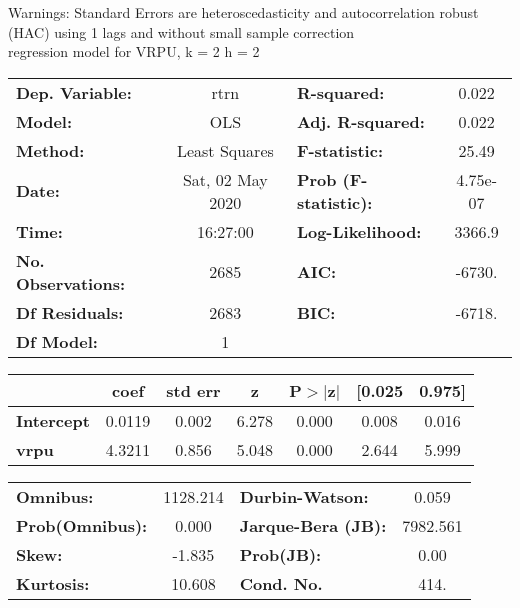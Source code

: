 Warnings: \newline
 [1] Standard Errors are heteroscedasticity and autocorrelation robust (HAC) using 1 lags and without small sample correction\\ 

regression model for VRPU, k = 2 h = 2\begin{center}
\begin{tabular}{lclc}
\toprule
\textbf{Dep. Variable:}    &       rtrn       & \textbf{  R-squared:         } &     0.022   \\
\textbf{Model:}            &       OLS        & \textbf{  Adj. R-squared:    } &     0.022   \\
\textbf{Method:}           &  Least Squares   & \textbf{  F-statistic:       } &     25.49   \\
\textbf{Date:}             & Sat, 02 May 2020 & \textbf{  Prob (F-statistic):} &  4.75e-07   \\
\textbf{Time:}             &     16:27:00     & \textbf{  Log-Likelihood:    } &    3366.9   \\
\textbf{No. Observations:} &        2685      & \textbf{  AIC:               } &    -6730.   \\
\textbf{Df Residuals:}     &        2683      & \textbf{  BIC:               } &    -6718.   \\
\textbf{Df Model:}         &           1      & \textbf{                     } &             \\
\bottomrule
\end{tabular}
\begin{tabular}{lcccccc}
                   & \textbf{coef} & \textbf{std err} & \textbf{z} & \textbf{P$> |$z$|$} & \textbf{[0.025} & \textbf{0.975]}  \\
\midrule
\textbf{Intercept} &       0.0119  &        0.002     &     6.278  &         0.000        &        0.008    &        0.016     \\
\textbf{vrpu}      &       4.3211  &        0.856     &     5.048  &         0.000        &        2.644    &        5.999     \\
\bottomrule
\end{tabular}
\begin{tabular}{lclc}
\textbf{Omnibus:}       & 1128.214 & \textbf{  Durbin-Watson:     } &    0.059  \\
\textbf{Prob(Omnibus):} &   0.000  & \textbf{  Jarque-Bera (JB):  } & 7982.561  \\
\textbf{Skew:}          &  -1.835  & \textbf{  Prob(JB):          } &     0.00  \\
\textbf{Kurtosis:}      &  10.608  & \textbf{  Cond. No.          } &     414.  \\
\bottomrule
\end{tabular}
\end{center}

